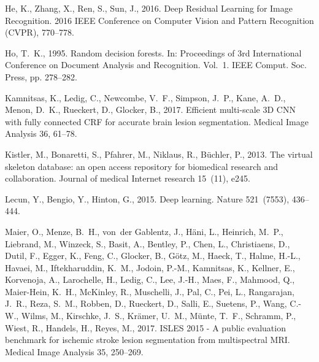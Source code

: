\documentclass[letterpaper,final,authoryear,3p,times,twocolumn]{elsarticle}
\begin{document}
\begin{thebibliography}{36}
He, K., Zhang, X., Ren, S., Sun, J., 2016. {Deep Residual Learning for Image
  Recognition}. 2016 IEEE Conference on Computer Vision and Pattern Recognition
  (CVPR), 770--778.

Ho, T.~K., 1995. {Random decision forests}. In: Proceedings of 3rd
  International Conference on Document Analysis and Recognition. Vol.~1. IEEE
  Comput. Soc. Press, pp. 278--282.

Kamnitsas, K., Ledig, C., Newcombe, V.~F., Simpson, J.~P., Kane, A.~D., Menon,
  D.~K., Rueckert, D., Glocker, B., 2017. {Efficient multi-scale 3D CNN with
  fully connected CRF for accurate brain lesion segmentation}. Medical Image
  Analysis 36, 61--78.

Kistler, M., Bonaretti, S., Pfahrer, M., Niklaus, R., B{\"{u}}chler, P., 2013.
  {The virtual skeleton database: an open access repository for biomedical
  research and collaboration.} Journal of medical Internet research 15~(11),
  e245.

Lecun, Y., Bengio, Y., Hinton, G., 2015. {Deep learning}. Nature 521~(7553),
  436--444.

Maier, O., Menze, B.~H., von~der Gablentz, J., H{\"{a}}ni, L., Heinrich, M.~P.,
  Liebrand, M., Winzeck, S., Basit, A., Bentley, P., Chen, L., Christiaens, D.,
  Dutil, F., Egger, K., Feng, C., Glocker, B., G{\"{o}}tz, M., Haeck, T.,
  Halme, H.-L., Havaei, M., Iftekharuddin, K.~M., Jodoin, P.-M., Kamnitsas, K.,
  Kellner, E., Korvenoja, A., Larochelle, H., Ledig, C., Lee, J.-H., Maes, F.,
  Mahmood, Q., Maier-Hein, K.~H., McKinley, R., Muschelli, J., Pal, C., Pei,
  L., Rangarajan, J.~R., Reza, S.~M., Robben, D., Rueckert, D., Salli, E.,
  Suetens, P., Wang, C.-W., Wilms, M., Kirschke, J.~S., Kr{\"{a}}mer, U.~M.,
  M{\"{u}}nte, T.~F., Schramm, P., Wiest, R., Handels, H., Reyes, M., 2017.
  {ISLES 2015 - A public evaluation benchmark for ischemic stroke lesion
  segmentation from multispectral MRI}. Medical Image Analysis 35, 250--269.


\end{thebibliography}
\end{document}
